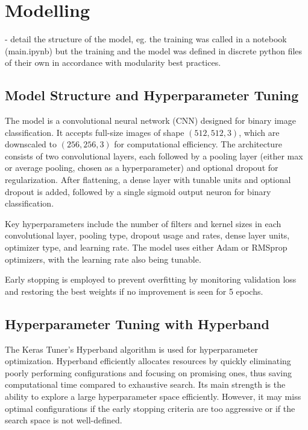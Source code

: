 \section{Modelling}

- detail the structure of the model, eg. the training was called in a notebook (main.ipynb) but the training and the model was defined in discrete python files of their own in accordance with modularity best practices.

\subsection{Model Structure and Hyperparameter Tuning}

The model is a convolutional neural network (CNN) designed for binary image classification. It accepts full-size images of shape $(512, 512, 3)$, which are downscaled to $(256, 256, 3)$ for computational efficiency. The architecture consists of two convolutional layers, each followed by a pooling layer (either max or average pooling, chosen as a hyperparameter) and optional dropout for regularization. After flattening, a dense layer with tunable units and optional dropout is added, followed by a single sigmoid output neuron for binary classification.

Key hyperparameters include the number of filters and kernel sizes in each convolutional layer, pooling type, dropout usage and rates, dense layer units, optimizer type, and learning rate. The model uses either Adam or RMSprop optimizers, with the learning rate also being tunable.

Early stopping is employed to prevent overfitting by monitoring validation loss and restoring the best weights if no improvement is seen for 5 epochs.

\subsection{Hyperparameter Tuning with Hyperband}

The Keras Tuner's Hyperband algorithm is used for hyperparameter optimization. Hyperband efficiently allocates resources by quickly eliminating poorly performing configurations and focusing on promising ones, thus saving computational time compared to exhaustive search. Its main strength is the ability to explore a large hyperparameter space efficiently. However, it may miss optimal configurations if the early stopping criteria are too aggressive or if the search space is not well-defined.

